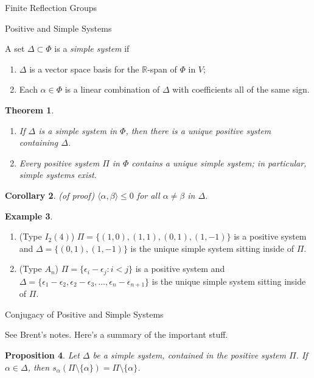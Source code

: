 \documentclass[12pt]{nauthesis}
\newtheorem{theorem}{Theorem}[section]
\newtheorem{corollary}[theorem]{Corollary}
\newtheorem{proposition}[theorem]{Proposition}
\theoremstyle{definition}
\newtheorem{example}[theorem]{Example}
\newcommand{\R}{\mathbb{R}}
\renewcommand{\(}{\big(}
\renewcommand{\)}{\big)}
\begin{document}
\begin{flushleft}
\begin{chapter}{Finite Reflection Groups}
\begin{section}{Positive and Simple Systems}
\medskip 

A set $\Delta \subset \Phi$ is a \emph{simple system}  if 
\begin{enumerate}
  \item[(i)] $\Delta$ is a vector space basis for the $\R$-span of $\Phi$ in $V$; 
  \item[(ii)] Each $\alpha \in \Phi$ is a linear combination of $\Delta$ with coefficients all of the same sign.
\end{enumerate}

\begin{theorem}
\ 
\begin{enumerate}
  \item[(a)] If $\Delta$ is a simple system in $\Phi$, then there is a unique positive system containing $\Delta$.
  \item[(b)] Every positive system $\Pi$ in $\Phi$ contains a unique simple system; in particular, simple systems exist.
\end{enumerate}
\end{theorem}

\medskip

\begin{corollary}{\rm{(of proof)}}
$\langle \alpha, \beta \rangle \leq 0$ for all $\alpha \neq \beta$ in $\Delta$.
\end{corollary}

\begin{example}
\ 
\begin{enumerate}
  \item[(a)] (Type $I_2(4)$) $\Pi=\{(1,0), (1,1), (0,1), (1,-1)\}$ is a positive system and $\Delta=\{(0,1), (1,-1)\}$ is the unique simple system sitting inside of $\Pi$.
  \item[(b)] (Type $A_n$) $\Pi=\{\epsilon_i-\epsilon_j: i<j\}$ is a positive system and $\Delta=\{\epsilon_1-\epsilon_2, \epsilon_2-\epsilon_3, \dots, \epsilon_n-\epsilon_{n+1}\}$ is the unique simple system sitting inside of $\Pi$.
\end{enumerate}
\end{example}

\end{section}

\begin{section}{Conjugacy of Positive and Simple Systems}

See Brent's notes.  Here's a summary of the important stuff.

\medskip

\begin{proposition}
Let $\Delta$ be a simple system, contained in the positive system $\Pi$.  If $\alpha \in \Delta$, then $s_\alpha(\Pi\setminus \{\alpha\})=\Pi\setminus \{\alpha\}$.
\end{proposition}


\end{section}
\end{chapter}
\end{flushleft}
\end{document}
